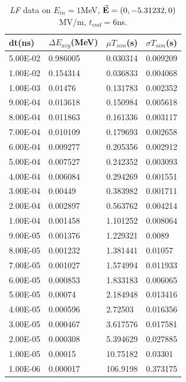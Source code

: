 \documentclass[a4paper,oneside,12pt]{report}
\numberwithin{equation}{chapter}
\begin{document}
{\begin{table}[H]
    \centering
    \caption{\textit{LF} data on $E_{in}=1$MeV, $\vec{\textbf{E}}=(0, -5.31232, 0)$ MV/m, $t_{end}=6$ns.}
    \vspace{10pt}
    \begin{tabular}{|l|l|l|l|}
    \hline
    dt(ns)       & $\Delta E_{avg}$(MeV) & $\mu T_{sim}$(s)    & $\sigma T_{sim}$(s) \\\hline
    5.00E-02 & 0.986005     & 0.030314 & 0.009209 \\\hline
    1.00E-02 & 0.154314     & 0.036833 & 0.004068 \\\hline
    1.00E-03 & 0.01476      & 0.131783 & 0.002352 \\\hline
    9.00E-04 & 0.013618     & 0.150984 & 0.005618 \\\hline
    8.00E-04 & 0.011863     & 0.161336 & 0.003117 \\\hline
    7.00E-04 & 0.010109     & 0.179693 & 0.002658 \\\hline
    6.00E-04 & 0.009277     & 0.205356 & 0.002912 \\\hline
    5.00E-04 & 0.007527     & 0.242352 & 0.003093 \\\hline
    4.00E-04 & 0.006084     & 0.294269 & 0.001551 \\\hline
    3.00E-04 & 0.00449      & 0.383982 & 0.001711 \\\hline
    2.00E-04 & 0.002897     & 0.563762 & 0.004214 \\\hline
    1.00E-04 & 0.001458     & 1.101252 & 0.008064 \\\hline
    9.00E-05 & 0.001376     & 1.229321 & 0.0089   \\\hline
    8.00E-05 & 0.001232     & 1.381441 & 0.01057  \\\hline
    7.00E-05 & 0.001027     & 1.574994 & 0.011933 \\\hline
    6.00E-05 & 0.000853     & 1.833183 & 0.006065 \\\hline
    5.00E-05 & 0.00074      & 2.184948 & 0.013416 \\\hline
    4.00E-05 & 0.000596     & 2.72503  & 0.016356 \\\hline
    3.00E-05 & 0.000467     & 3.617576 & 0.017581 \\\hline
    2.00E-05 & 0.000308     & 5.394629 & 0.027885 \\\hline
    1.00E-05 & 0.00015      & 10.75182 & 0.03301  \\\hline
    1.00E-06 & 0.000017     & 106.9198 & 0.373175 \\\hline
    \end{tabular}
    \label{tab:lf_statE90_table}
\end{table}

}
\end{document}
